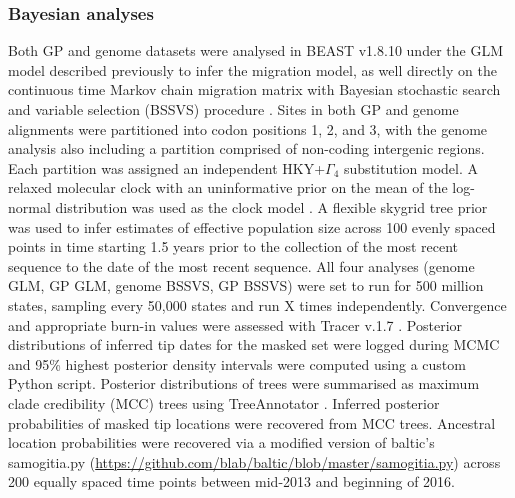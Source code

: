 \documentclass[11pt,oneside,letterpaper]{article}
\begin{document}
\subsubsection*{Bayesian analyses}
Both GP and genome datasets were analysed in BEAST v1.8.10 \citep{suchard_bayesian_2018} under the GLM model described previously \citep{faria_simultaneously_2013,lemey_unifying_2014,dudas_virus_2017} to infer the migration model, as well directly on the continuous time Markov chain migration matrix with Bayesian stochastic search and variable selection (BSSVS) procedure \citep{lemey_bayesian_2009}.
Sites in both GP and genome alignments were partitioned into codon positions 1, 2, and 3, with the genome analysis also including a partition comprised of non-coding intergenic regions.
Each partition was assigned an independent HKY+$\Gamma_{4}$ \citep{hky_1985,yang_1994} substitution model.
A relaxed molecular clock with an uninformative prior on the mean \citep{ferreira_bayesian_nodate} of the log-normal distribution was used as the clock model \citep{drummond_2006}.
A flexible skygrid tree prior \citep{gill_2013} was used to infer estimates of effective population size across 100 evenly spaced points in time starting 1.5 years prior to the collection of the most recent sequence to the date of the most recent sequence.
All four analyses (genome GLM, GP GLM, genome BSSVS, GP BSSVS) were set to run for 500 million states, sampling  every 50,000 states and run X times independently.
Convergence and appropriate burn-in values were assessed with Tracer v.1.7 \citep{rambaut_posterior_2018}.
Posterior distributions of inferred tip dates for the masked set were logged during MCMC and 95\% highest posterior density intervals were computed using a custom Python script.
Posterior distributions of trees were summarised as maximum clade credibility (MCC) trees using TreeAnnotator \citep{suchard_bayesian_2018}.
Inferred posterior probabilities of masked tip locations were recovered from MCC trees.
Ancestral location probabilities were recovered via a modified version of baltic's samogitia.py (\url{https://github.com/blab/baltic/blob/master/samogitia.py}) across 200 equally spaced time points between mid-2013 and beginning of 2016.
\end{document}
